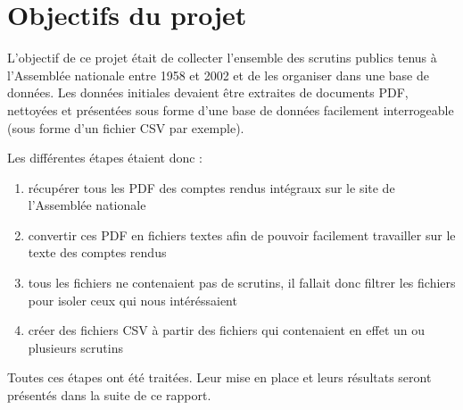 \section{Objectifs du projet}

L'objectif de ce projet était de collecter l'ensemble des scrutins publics tenus à l'Assemblée nationale entre 1958 et 2002 et de les organiser dans une base de données.
Les données initiales devaient être extraites de documents PDF, nettoyées et présentées sous forme d'une base de données facilement interrogeable (sous forme d'un fichier CSV par exemple).

Les différentes étapes étaient donc :
\begin{enumerate}
\item récupérer tous les PDF des comptes rendus intégraux sur le site de l'Assemblée nationale
\item convertir ces PDF en fichiers textes afin de pouvoir facilement travailler sur le texte des comptes rendus
\item tous les fichiers ne contenaient pas de scrutins, il fallait donc filtrer les fichiers pour isoler ceux qui nous intéréssaient
\item créer des fichiers CSV à partir des fichiers qui contenaient en effet un ou plusieurs scrutins
\end{enumerate}

Toutes ces étapes ont été traitées. Leur mise en place et leurs résultats seront présentés dans la suite de ce rapport.
